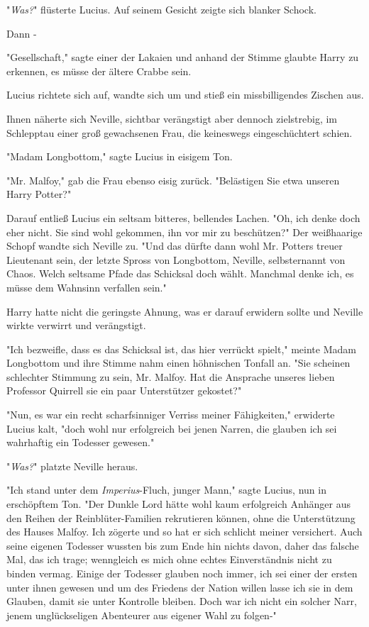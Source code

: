 {"\emph{Was?}" flüsterte Lucius. Auf seinem Gesicht zeigte sich blanker Schock.

Dann -

"Gesellschaft," sagte einer der Lakaien und anhand der Stimme glaubte Harry zu erkennen, es müsse der ältere Crabbe sein.

Lucius richtete sich auf, wandte sich um und stieß ein missbilligendes Zischen aus.

Ihnen näherte sich Neville, sichtbar verängstigt aber dennoch zielstrebig, im Schlepptau einer groß gewachsenen Frau, die keineswegs eingeschüchtert schien.

"Madam Longbottom," sagte Lucius in eisigem Ton.

"Mr. Malfoy," gab die Frau ebenso eisig zurück. "Belästigen Sie etwa unseren Harry Potter?"

Darauf entließ Lucius ein seltsam bitteres, bellendes Lachen. "Oh, ich denke doch eher nicht. Sie sind wohl gekommen, ihn vor mir zu beschützen?" Der weißhaarige Schopf wandte sich Neville zu. "Und das dürfte dann wohl Mr. Potters treuer Lieutenant sein, der letzte Spross von Longbottom, Neville, selbsternannt von Chaos. Welch seltsame Pfade das Schicksal doch wählt. Manchmal denke ich, es müsse dem Wahnsinn verfallen sein."

Harry hatte nicht die geringste Ahnung, was er darauf erwidern sollte und Neville wirkte verwirrt und verängstigt.

"Ich bezweifle, dass es das Schicksal ist, das hier verrückt spielt," meinte Madam Longbottom und ihre Stimme nahm einen höhnischen Tonfall an. "Sie scheinen schlechter Stimmung zu sein, Mr. Malfoy. Hat die Ansprache unseres lieben Professor Quirrell sie ein paar Unterstützer gekostet?"

"Nun, es war ein recht scharfsinniger Verriss meiner Fähigkeiten," erwiderte Lucius kalt, "doch wohl nur erfolgreich bei jenen Narren, die glauben ich sei wahrhaftig ein Todesser gewesen."

"\emph{Was?}" platzte Neville heraus.

"Ich stand unter dem \emph{Imperius}-Fluch, junger Mann," sagte Lucius, nun in erschöpftem Ton. "Der Dunkle Lord hätte wohl kaum erfolgreich Anhänger aus den Reihen der Reinblüter-Familien rekrutieren können, ohne die Unterstützung des Hauses Malfoy. Ich zögerte und so hat er sich schlicht meiner versichert. Auch seine eigenen Todesser wussten bis zum Ende hin nichts davon, daher das falsche Mal, das ich trage; wenngleich es mich ohne echtes Einverständnis nicht zu binden vermag. Einige der Todesser glauben noch immer, ich sei einer der ersten unter ihnen gewesen und um des Friedens der Nation willen lasse ich sie in dem Glauben, damit sie unter Kontrolle bleiben. Doch war ich nicht ein solcher Narr, jenem unglückseligen Abenteurer aus eigener Wahl zu folgen-"

}
